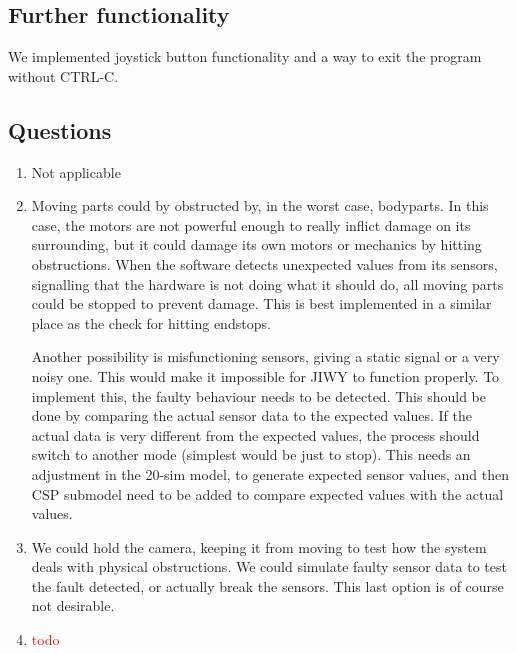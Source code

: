 \documentclass[a4paper,twoside,11pt]{article}
\newcommand{\todo}[1]{{\Large\sc\textcolor{red}{#1}}}
\begin{document}
\subsection{Further functionality}
We implemented joystick button functionality and a way to exit the program without CTRL-C.

\subsection{Questions}
\begin{enumerate}
	\item Not applicable
	\item Moving parts could by obstructed by, in the worst case, bodyparts. In this case, the motors are not powerful enough to really inflict damage on its surrounding, but it could damage its own motors or mechanics by hitting obstructions. When the software detects unexpected values from its sensors, signalling that the hardware is not doing what it should do, all moving parts could be stopped to prevent damage. This is best implemented in a similar place as the check for hitting endstops.
	
	Another possibility is misfunctioning sensors, giving a static signal or a very noisy one. This would make it impossible for JIWY to function properly. To implement this, the faulty behaviour needs to be detected. This should be done by comparing the actual sensor data to the expected values. If the actual data is very different from the expected values, the process should switch to another mode (simplest would be just to stop). This needs an adjustment in the 20-sim model, to generate expected sensor values, and then CSP submodel need to be added to compare expected values with the actual values.
	\item We could hold the camera, keeping it from moving to test how the system deals with physical obstructions. We could simulate faulty sensor data to test the fault detected, or actually break the sensors. This last option is of course not desirable.
	\item \todo{todo}
\end{enumerate}
\end{document}
